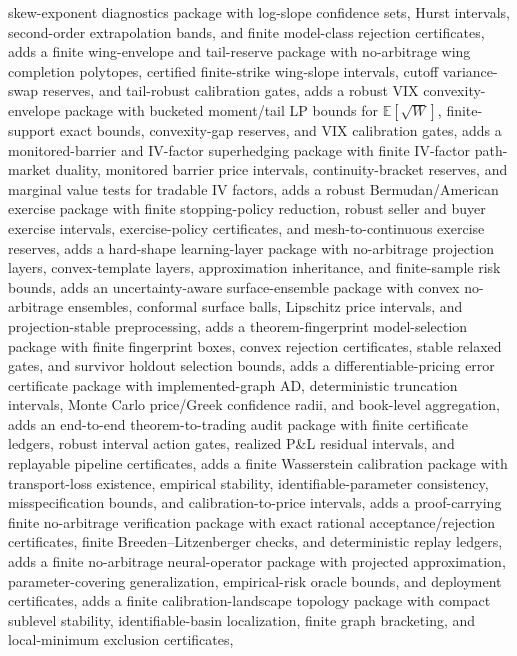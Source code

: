 \documentclass[11pt]{article}
\begin{document}
skew-exponent diagnostics package with log-slope confidence sets, Hurst intervals,
second-order extrapolation bands, and finite model-class rejection certificates,
adds a finite wing-envelope and tail-reserve package with no-arbitrage wing
completion polytopes, certified finite-strike wing-slope intervals, cutoff
variance-swap reserves, and tail-robust calibration gates, adds a robust VIX
convexity-envelope package with bucketed moment/tail LP bounds for
\(\mathbb E[\sqrt W]\), finite-support exact bounds, convexity-gap reserves, and VIX
calibration gates, adds a monitored-barrier and IV-factor superhedging package
with finite IV-factor path-market duality, monitored barrier price intervals,
continuity-bracket reserves, and marginal value tests for tradable IV factors,
adds a robust Bermudan/American exercise package with finite stopping-policy
reduction, robust seller and buyer exercise intervals, exercise-policy
certificates, and mesh-to-continuous exercise reserves, adds a hard-shape
learning-layer package with no-arbitrage projection layers, convex-template
layers, approximation inheritance, and finite-sample risk bounds, adds an
uncertainty-aware surface-ensemble package with convex no-arbitrage ensembles,
conformal surface balls, Lipschitz price intervals, and projection-stable
preprocessing, adds a theorem-fingerprint model-selection package with
finite fingerprint boxes, convex rejection certificates, stable relaxed gates,
and survivor holdout selection bounds, adds a differentiable-pricing error
certificate package with implemented-graph AD, deterministic truncation
intervals, Monte Carlo price/Greek confidence radii, and book-level aggregation,
adds an end-to-end theorem-to-trading audit package with finite certificate
ledgers, robust interval action gates, realized P\&L residual intervals, and
replayable pipeline certificates, adds a finite Wasserstein calibration package
with transport-loss existence, empirical stability, identifiable-parameter
consistency, misspecification bounds, and calibration-to-price intervals, adds a
proof-carrying finite no-arbitrage verification package with exact rational
acceptance/rejection certificates, finite Breeden--Litzenberger checks, and
deterministic replay ledgers, adds a finite no-arbitrage neural-operator package
with projected approximation, parameter-covering generalization, empirical-risk
oracle bounds, and deployment certificates, adds a finite calibration-landscape
topology package with compact sublevel stability, identifiable-basin
localization, finite graph bracketing, and local-minimum exclusion certificates,
\end{document}

